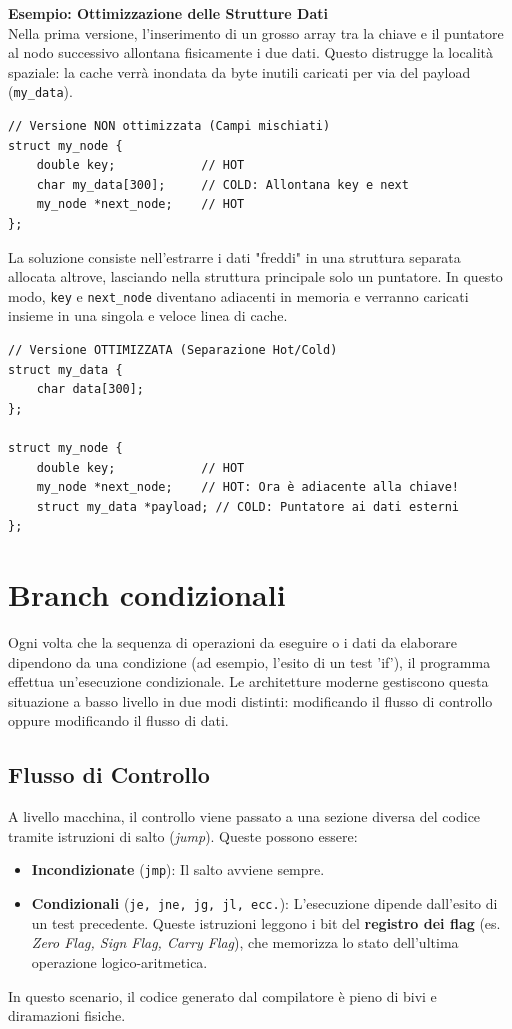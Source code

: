 \begin{framed}
\footnotesize
\noindent
\textbf{Esempio: Ottimizzazione delle Strutture Dati} \\
Nella prima versione, l'inserimento di un grosso array tra la chiave e il puntatore al nodo successivo allontana fisicamente i due dati. Questo distrugge la località spaziale: la cache verrà inondata da byte inutili caricati per via del payload (\texttt{my\_data}).

\begin{verbatim}
// Versione NON ottimizzata (Campi mischiati)
struct my_node {
    double key;            // HOT
    char my_data[300];     // COLD: Allontana key e next 
    my_node *next_node;    // HOT
};
\end{verbatim}
\end{framed}
La soluzione consiste nell'estrarre i dati "freddi" in una struttura separata allocata altrove, lasciando nella struttura principale solo un puntatore. In questo modo, \texttt{key} e \texttt{next\_node} diventano adiacenti in memoria e verranno caricati insieme in una singola e veloce linea di cache.
\begin{framed}
\footnotesize
\begin{verbatim}
// Versione OTTIMIZZATA (Separazione Hot/Cold)
struct my_data {
    char data[300];
};

struct my_node {
    double key;            // HOT
    my_node *next_node;    // HOT: Ora è adiacente alla chiave!
    struct my_data *payload; // COLD: Puntatore ai dati esterni
};
\end{verbatim}
\end{framed}

\section{Branch condizionali}
Ogni volta che la sequenza di operazioni da eseguire o i dati da elaborare dipendono da una condizione (ad esempio, l'esito di un test 'if'), il programma effettua un'esecuzione condizionale. Le architetture moderne gestiscono questa situazione a basso livello in due modi distinti: modificando il flusso di controllo oppure modificando il flusso di dati.

\subsection*{Flusso di Controllo}
A livello macchina, il controllo viene passato a una sezione diversa del codice tramite istruzioni di salto (\textit{jump}). Queste possono essere:
\begin{itemize}
    \item \textbf{Incondizionate} (\texttt{jmp}): Il salto avviene sempre.
    \item \textbf{Condizionali} (\texttt{je, jne, jg, jl, ecc.}): L'esecuzione dipende dall'esito di un test precedente. Queste istruzioni leggono i bit del \textbf{registro dei flag} (es. \textit{Zero Flag, Sign Flag, Carry Flag}), che memorizza lo stato dell'ultima operazione logico-aritmetica.
\end{itemize}
In questo scenario, il codice generato dal compilatore è pieno di bivi e diramazioni fisiche.

